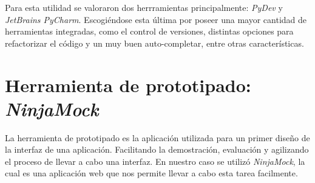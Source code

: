 Para esta utilidad se valoraron dos herrramientas principalmente: \textit{PyDev} y \textit{JetBrains PyCharm}. Escogiéndose esta última por poseer una mayor cantidad de herramientas integradas, como el control de versiones, distintas opciones para refactorizar el código y un muy buen auto-completar, entre otras características.

\section{Herramienta de prototipado: \textit{NinjaMock}}

La herramienta de prototipado es la aplicación utilizada para un primer diseño de la interfaz de una aplicación. Facilitando la demostración, evaluación y agilizando el proceso de llevar a cabo una interfaz. En nuestro caso se utilizó \textit{NinjaMock}, la cual es una aplicación web que nos permite llevar a cabo esta tarea facilmente.